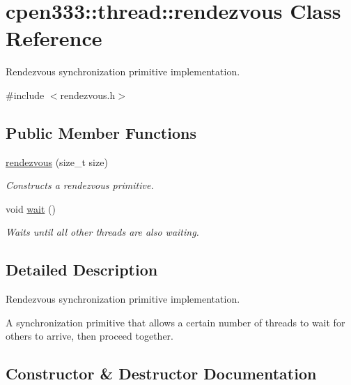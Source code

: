 \hypertarget{classcpen333_1_1thread_1_1rendezvous}{}\section{cpen333\+:\+:thread\+:\+:rendezvous Class Reference}
\label{classcpen333_1_1thread_1_1rendezvous}


Rendezvous synchronization primitive implementation.  




{\ttfamily \#include $<$rendezvous.\+h$>$}

\subsection*{Public Member Functions}
\begin{DoxyCompactItemize}
\item 
\hyperlink{classcpen333_1_1thread_1_1rendezvous_afcc51be93c14299ec2037ed0bf301be5}{rendezvous} (size\+\_\+t size)
\begin{DoxyCompactList}\small\item\em Constructs a rendezvous primitive. \end{DoxyCompactList}\item 
void \hyperlink{classcpen333_1_1thread_1_1rendezvous_ad712b180014e24f3b33707726984c365}{wait} ()
\begin{DoxyCompactList}\small\item\em Waits until all other threads are also waiting. \end{DoxyCompactList}\end{DoxyCompactItemize}


\subsection{Detailed Description}
Rendezvous synchronization primitive implementation. 

A synchronization primitive that allows a certain number of threads to wait for others to arrive, then proceed together. 

\subsection{Constructor \& Destructor Documentation}
\mbox{\label{classcpen333_1_1thread_1_1rendezvous_afcc51be93c14299ec2037ed0bf301be5}} 

